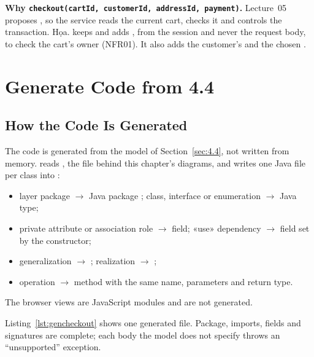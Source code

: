 \textbf{Why \texttt{checkout(cartId, customerId, addressId, payment)}.} Lecture~05 proposes
, so the service reads the current cart, checks it and controls the transaction.
Họa. keeps  and adds , from the session and never the request body, to check the
cart's owner (NFR01). It also adds the customer's  and the chosen .

\section{Generate Code from 4.4}\label{sec:4.5}

\subsection{How the Code Is Generated}\label{sec:4.5.1}

The code is generated from the model of Section~\ref{sec:4.4}, not written from memory. 
reads , the file behind this chapter's diagrams, and writes one Java file per class into
:
\begin{itemize}
\item layer package $\rightarrow$ Java package ; class, interface or enumeration
$\rightarrow$ Java type;
\item private attribute or association role $\rightarrow$ field; «use» dependency $\rightarrow$ field set by the
constructor;
\item generalization $\rightarrow$ ; realization $\rightarrow$ ;
\item operation $\rightarrow$ method with the same name, parameters and return type.
\end{itemize}
The browser views are JavaScript modules and are not generated.

Listing~\ref{lst:gencheckout} shows one generated file. Package, imports, fields and signatures are complete; each
body the model does not specify throws an ``unsupported'' exception.

%
{}

